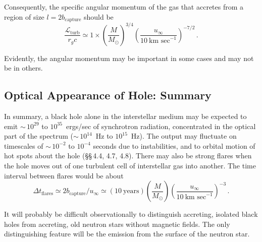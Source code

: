 Consequently, the specific angular momentum of the gas that accretes from a
region of size $l = 2b_\text{capture}$ should be
\begin{equation}
\frac{\mathscr{L}_\text{turb}}{r_g c}
\simeq 1 \times
\left(\frac{M}{M_\odot}\right)^{3/4}
\left(\frac{u_\infty}{10~\text{km~sec}^{-1}}\right)^{-7/2}\,.
\tag{4.8.10}
\end{equation}

Evidently, the angular momentum may be important in some cases and may not
be in others.


\subsection{Optical Appearance of Hole: Summary}
\label{sec:4.9}

In summary, a black hole alone in the interstellar medium may be expected to
emit ${\sim}\,10^{29}$ to $10^{35}$~ergs/sec of synchrotron radiation, concentrated in the
optical part of the spectrum (${\sim}\,10^{14}$~Hz to $10^{15}$~Hz). The output may
fluctuate on timescales of ${\sim}\,10^{-2}$ to $10^{-4}$ seconds due to instabilities, and to
orbital motion of hot spots about the hole (\S\S\,4.4, 4.7, 4.8). There may also
be strong flares when the hole moves out of one turbulent cell of interstellar
gas into another. The time interval between flares would be about
\begin{equation}
\Delta t_\text{flares}
\simeq 2b_\text{capture}/u_\infty
\simeq (10~\text{years})
\left(\frac{M}{M_\odot}\right)
\left(\frac{u_\infty}{10~\text{km~sec}^{-1}}\right)^{-3}\,.
\tag{4.9.1}
\end{equation}

It will probably be difficult observationally to distinguish accreting, isolated
black holes from accreting, old neutron stars without magnetic fields. The only
distinguishing feature will be the emission from the surface of the neutron star.
